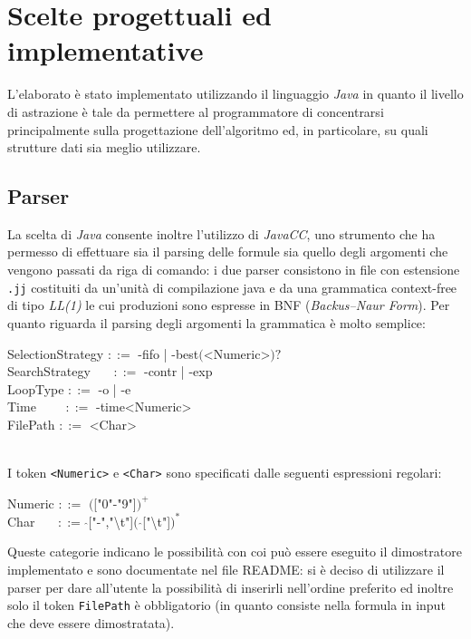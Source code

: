 \documentclass[a4paper,11pt]{article}
\newcommand{\grammarindent}[1][1]{\hspace*{#1\parindent}\ignorespaces}
\begin{document}
\section{Scelte progettuali ed implementative}
L'elaborato è stato implementato utilizzando il linguaggio \emph{Java} in quanto il livello di astrazione è tale da permettere al programmatore di concentrarsi principalmente sulla progettazione dell'algoritmo ed, in particolare, su quali strutture dati sia meglio utilizzare. 
\subsection{Parser}
La scelta di \emph{Java} consente inoltre l'utilizzo di \emph{JavaCC}, uno strumento che ha permesso di effettuare sia il parsing delle formule sia quello degli argomenti che vengono passati da riga di comando: i due parser consistono in file con estensione \texttt{.jj} costituiti da un'unità di compilazione java e da una grammatica context-free di tipo \emph{LL(1)} le cui produzioni sono espresse in BNF (\emph{Backus–Naur Form}).
Per quanto riguarda il parsing degli argomenti la grammatica è molto semplice:
\\[1mm]
\begin{ttfamily}
\grammarindent SelectionStrategy $::=$  -fifo | -best$($<Numeric>$)?$ \\
\grammarindent SearchStrategy ~~~$::=$  -contr | -exp \\
\grammarindent LoopType $::=$ 	-o | -e\\
\grammarindent Time ~~~~$::=$ 	-time<Numeric>\\
\grammarindent FilePath $::=$ <Char>\\
\\[1mm]
\end{ttfamily}
I token \texttt{<Numeric>} e \texttt{<Char>} sono specificati dalle 
seguenti espressioni regolari:\\[1mm]
\begin{ttfamily}
\grammarindent Numeric $::=$ $($["0"-"9"]$)^+$\\
\grammarindent Char~~~ $::=$ $\widehat{}$["-","\textbackslash t"]$($ $\widehat{}$["\textbackslash t"]$)^*$\\[1.5mm]
\end{ttfamily}
Queste categorie indicano le possibilità con coi può essere eseguito il dimostratore implementato e sono documentate nel file README: si è deciso di utilizzare il parser per dare all'utente la possibilità di inserirli nell'ordine preferito ed inoltre solo il token \texttt{FilePath} è obbligatorio (in quanto consiste nella formula in input che deve essere dimostratata).
\end{document}

